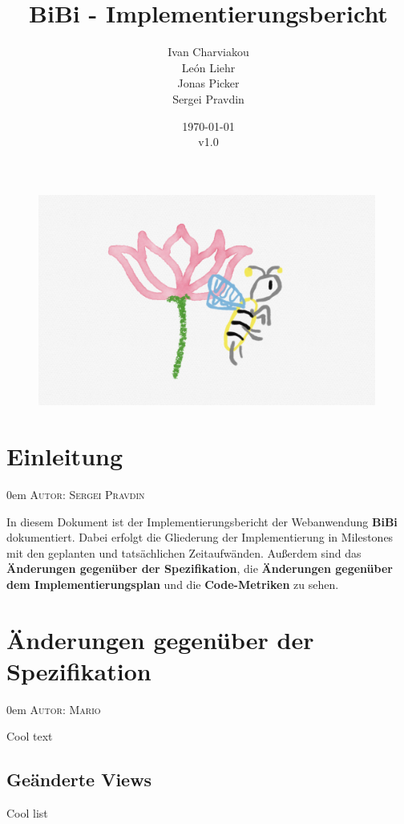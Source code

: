 \documentclass{article}
\title{BiBi - Implementierungsbericht}
\date{\today\\v1.0}
\author{
	Ivan Charviakou\\
	León Liehr\\
	Jonas Picker\\
	Sergei Pravdin
}
\makeatletter
\newcommand{\sectionauthor}[1]{
	{\parindent 0em \large \scshape Autor: #1 \par \nobreak \vspace*{1em}}
	\@afterheading
}
\makeatother
\begin{document}
\maketitle
\begin{figure}[H]
	\centering
	\includegraphics[width = 30em]{Logo}
\end{figure}
\newpage
\tableofcontents
\newpage

\section{Einleitung}
\sectionauthor{Sergei Pravdin}
In diesem Dokument ist der Implementierungsbericht der Webanwendung \textbf{BiBi} dokumentiert. Dabei erfolgt die Gliederung der Implementierung in Milestones mit den geplanten und tatsächlichen Zeitaufwänden. Außerdem sind das \textbf{Änderungen gegenüber der Spezifikation}, die \textbf{Änderungen gegenüber dem Implementierungsplan} und die \textbf{Code-Metriken} zu sehen.

\section{Änderungen gegenüber der Spezifikation}
\sectionauthor{Mario}
Cool text

\subsection{Geänderte Views}
Cool list
\end{document}
